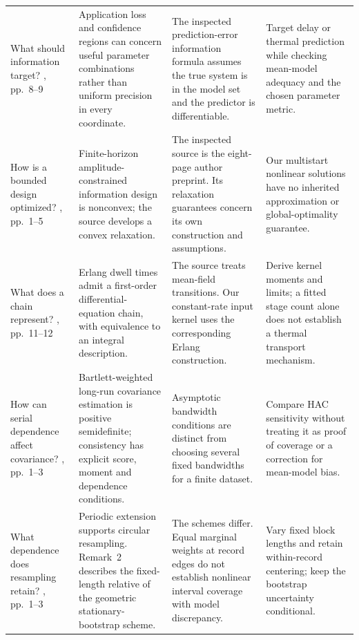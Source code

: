 \begin{longtable}{>{\raggedright\arraybackslash}p{.17\linewidth}>{\raggedright\arraybackslash}p{.25\linewidth}>{\raggedright\arraybackslash}p{.25\linewidth}>{\raggedright\arraybackslash}p{.19\linewidth}}
 What should information target?\newline
 \citet{hjalmarsson-2009-system}, pp.~8--9
 & Application loss and confidence regions can concern useful parameter
 combinations rather than uniform precision in every coordinate.
 & The inspected prediction-error information formula assumes the true system
 is in the model set and the predictor is differentiable.
 & Target delay or thermal prediction while checking mean-model adequacy and
 the chosen parameter metric. \\[.6em]

 How is a bounded design optimized?\newline
 \citet{manchester-2010-input}, pp.~1--5
 & Finite-horizon amplitude-constrained information design is nonconvex; the
 source develops a convex relaxation.
 & The inspected source is the eight-page author preprint. Its relaxation
 guarantees concern its own construction and assumptions.
 & Our multistart nonlinear solutions have no inherited approximation or
 global-optimality guarantee. \\[.6em]

 What does a chain represent?\newline
 \citet{hurtado-2019-generalizations}, pp.~11--12
 & Erlang dwell times admit a first-order differential-equation chain, with
 equivalence to an integral description.
 & The source treats mean-field transitions. Our constant-rate input kernel
 uses the corresponding Erlang construction.
 & Derive kernel moments and limits; a fitted stage count alone does not
 establish a thermal transport mechanism. \\[.6em]

 How can serial dependence affect covariance?\newline
 \citet{newey-1987-simple}, pp.~1--3
 & Bartlett-weighted long-run covariance estimation is positive semidefinite;
 consistency has explicit score, moment and dependence conditions.
 & Asymptotic bandwidth conditions are distinct from choosing several fixed
 bandwidths for a finite dataset.
 & Compare HAC sensitivity without treating it as proof of coverage or a
 correction for mean-model bias. \\[.6em]

 What dependence does resampling retain?\newline
 \citet{politis-1994-stationary}, pp.~1--3
 & Periodic extension supports circular resampling. Remark~2 describes the
 fixed-length relative of the geometric stationary-bootstrap scheme.
 & The schemes differ. Equal marginal weights at record edges do not establish
 nonlinear interval coverage with model discrepancy.
 & Vary fixed block lengths and retain within-record centering; keep the
 bootstrap uncertainty conditional. \\
\end{longtable}
\endgroup

